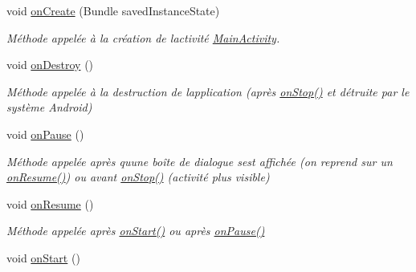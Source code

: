 \begin{DoxyCompactItemize}
\item 
void \hyperlink{classcom_1_1lasalle_1_1io__trucks_1_1_main_activity_a236d8585ed546ef42c0d2dfd3268893a}{on\+Create} (Bundle saved\+Instance\+State)
\begin{DoxyCompactList}\small\item\em Méthode appelée à la création de l\textquotesingle{}activité \hyperlink{classcom_1_1lasalle_1_1io__trucks_1_1_main_activity}{Main\+Activity}. \end{DoxyCompactList}\item 
void \hyperlink{classcom_1_1lasalle_1_1io__trucks_1_1_main_activity_a41e9b1eab2362456217786165b87d25e}{on\+Destroy} ()
\begin{DoxyCompactList}\small\item\em Méthode appelée à la destruction de l\textquotesingle{}application (après \hyperlink{classcom_1_1lasalle_1_1io__trucks_1_1_main_activity_a6fbad98934d4b04260faff49da3d52ad}{on\+Stop()} et détruite par le système Android) \end{DoxyCompactList}\item 
void \hyperlink{classcom_1_1lasalle_1_1io__trucks_1_1_main_activity_a3d9481fd69693e777afbbfba5ddb0132}{on\+Pause} ()
\begin{DoxyCompactList}\small\item\em Méthode appelée après qu\textquotesingle{}une boîte de dialogue s\textquotesingle{}est affichée (on reprend sur un \hyperlink{classcom_1_1lasalle_1_1io__trucks_1_1_main_activity_adc08807b3af20598d330f394acf55ecb}{on\+Resume()}) ou avant \hyperlink{classcom_1_1lasalle_1_1io__trucks_1_1_main_activity_a6fbad98934d4b04260faff49da3d52ad}{on\+Stop()} (activité plus visible) \end{DoxyCompactList}\item 
void \hyperlink{classcom_1_1lasalle_1_1io__trucks_1_1_main_activity_adc08807b3af20598d330f394acf55ecb}{on\+Resume} ()
\begin{DoxyCompactList}\small\item\em Méthode appelée après \hyperlink{classcom_1_1lasalle_1_1io__trucks_1_1_main_activity_a88715b4d1f7b33b3871849de4c667abf}{on\+Start()} ou après \hyperlink{classcom_1_1lasalle_1_1io__trucks_1_1_main_activity_a3d9481fd69693e777afbbfba5ddb0132}{on\+Pause()} \end{DoxyCompactList}\item 
void \hyperlink{classcom_1_1lasalle_1_1io__trucks_1_1_main_activity_a88715b4d1f7b33b3871849de4c667abf}{on\+Start} ()

\end{DoxyCompactItemize}
